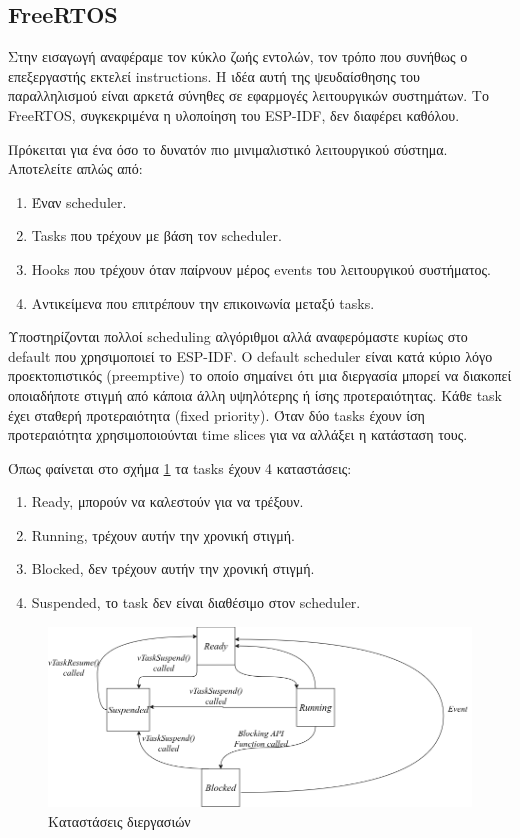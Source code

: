 \subsection{FreeRTOS}

Στην εισαγωγή αναφέραμε τον κύκλο ζωής εντολών, τον τρόπο
που συνήθως ο επεξεργαστής εκτελεί instructions. Η ιδέα
αυτή της ψευδαίσθησης του παραλληλισμού είναι αρκετά σύνηθες
σε εφαρμογές λειτουργικών συστημάτων. Το FreeRTOS, συγκεκριμένα
η υλοποίηση του ESP-IDF, δεν διαφέρει καθόλου.

Πρόκειται για ένα όσο το δυνατόν πιο μινιμαλιστικό λειτουργικού
σύστημα. Αποτελείτε απλώς από:

\begin{enumerate}
  \item Έναν scheduler.
  \item Tasks που τρέχουν με βάση τον scheduler.
  \item Hooks που τρέχουν όταν παίρνουν μέρος events του λειτουργικού συστήματος.
  \item Αντικείμενα που επιτρέπουν την επικοινωνία μεταξύ
    tasks.
\end{enumerate}

Υποστηρίζονται πολλοί scheduling αλγόριθμοι αλλά αναφερόμαστε κυρίως
στο default που χρησιμοποιεί το ESP-IDF. Ο default scheduler είναι
κατά κύριο λόγο προεκτοπιστικός (preemptive) το οποίο σημαίνει ότι μια
διεργασία μπορεί να διακοπεί οποιαδήποτε στιγμή από κάποια άλλη
υψηλότερης ή ίσης προτεραιότητας. Κάθε task έχει σταθερή προτεραιότητα
(fixed priority). Όταν δύο tasks έχουν ίση προτεραιότητα χρησιμοποιούνται
time slices για να αλλάξει η κατάσταση τους.

Όπως φαίνεται στο σχήμα \ref{fig:task_states} τα tasks έχουν 4 καταστάσεις:

\begin{enumerate}
\item Ready, μπορούν να καλεστούν για να τρέξουν.
\item Running, τρέχουν αυτήν την χρονική στιγμή.
\item Blocked, δεν τρέχουν αυτήν την χρονική στιγμή.
\item Suspended, το task δεν είναι διαθέσιμο στον scheduler.
\end{enumerate}
    
\begin{figure}[!htb]
    \centering
    \includegraphics[scale=0.4]{images/espidf/freertos_tasks.png}
    \caption{Καταστάσεις διεργασιών}
    \label{fig:task_states}
\end{figure}

